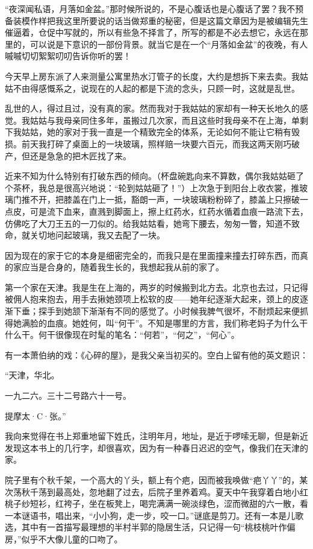 \par “夜深闻私语，月落如金盆。”那时候所说的，不是心腹话也是心腹话了罢？我不预备装模作样把我这里所要说的话当做郑重的秘密，但是这篇文章因为是被编辑先生催逼着，仓促中写就的，所以有些急不择言了，所写的都是不必去想它，永远在那里的，可以说是下意识的一部份背景。就当它是在一个“月落如金盆”的夜晚，有人嘁嘁切切絮絮叨叨告诉你听的罢！
\par 今天早上房东派了人来测量公寓里热水汀管子的长度，大约是想拆下来去卖。我姑姑不由得感慨系之，说现在的人起的都是下流的念头，只顾一时，这就是乱世。
\par 乱世的人，得过且过，没有真的家。然而我对于我姑姑的家却有一种天长地久的感觉。我姑姑与我母亲同住多年，虽搬过几次家，而且这些时我母亲不在上海，单剩下我姑姑，她的家对于我一直是一个精致完全的体系，无论如何不能让它稍有毁损。前天我打碎了桌面上的一块玻璃，照样赔一块要六百元，而我这两天刚巧破产，但还是急急的把木匠找了来。
\par 近来不知为什么特别有打破东西的倾向。（杯盘碗匙向来不算数，偶尔我姑姑砸了个茶杯，我总是很高兴地说：“轮到姑姑砸了！”）上次急于到阳台上收衣裳，推玻璃门推不开，把膝盖在门上一抵，豁朗一声，一块玻璃粉粉碎了，膝盖上只擦破一点皮，可是流下血来，直溅到脚面上，擦上红药水，红药水循着血痕一路流下去，仿佛吃了大刀王五的一刀似的。给我姑姑看，她弯下腰去，匆匆一瞥，知道不致命，就关切地问起玻璃，我又去配了一块。
\par 因为现在的家于它的本身是细密完全的，而我只是在里面撞来撞去打碎东西，而真的家应当是合身的，随着我生长的，我想起我从前的家了。
\par 第一个家在天津。我是生在上海的，两岁的时候搬到北方去。北京也去过，只记得被佣人抱来抱去，用手去揪她颈项上松软的皮——她年纪逐渐大起来，颈上的皮逐渐下垂；探手到她颔下渐渐有不同的感觉了。小时候我脾气很坏，不耐烦起来便抓得她满脸的血痕。她姓何，叫“何干”。不知是哪里的方言，我们称老妈子为什么干什么干。何干很像现在时髦的笔名：“何若”，“何之”，“何心”。
\par 有一本萧伯纳的戏：《心碎的屋》，是我父亲当初买的。空白上留有他的英文题识：
\par “天津，华北。
\par 一九二六。三十二号路六十一号。
\par 提摩太·C·张。”
\par 我向来觉得在书上郑重地留下姓氏，注明年月，地址，是近于啰嗦无聊，但是新近发现这本书上的几行字，却很喜欢，因为有一种春日迟迟的空气，像我们在天津的家。
\par 院子里有个秋千架，一个高大的丫头，额上有个疤，因而被我唤做“疤丫丫”的，某次荡秋千荡到最高处，忽地翻了过去，后院子里养着鸡。夏天中午我穿着白地小红桃子纱短衫，红袴子，坐在板凳上，喝完满满一碗淡绿色，涩而微甜的六一散，看一本谜语书，唱出来，“小小狗，走一步，咬一口。”谜底是剪刀。还有一本是儿歌选，其中有一首描写最理想的半村半郭的隐居生活，只记得一句“桃枝桃叶作偏房，”似乎不大像儿童的口吻了。
